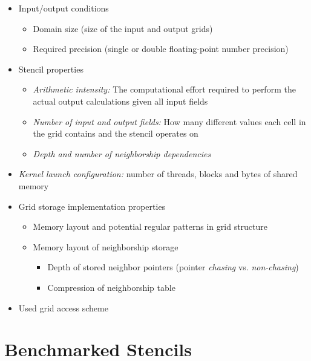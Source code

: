 \begin{itemize}
    \item 
        Input/output conditions 
        \begin{itemize}
            \item Domain size (size of the input and output grids)
            \item Required precision (single or double floating-point number precision)
        \end{itemize}
    \item
        Stencil properties
        \begin{itemize}
            \item \emph{Arithmetic intensity:} The computational effort required to perform the actual output calculations given all input fields
            \item \emph{Number of input and output fields:} How many different values each cell in the grid contains and the stencil operates on
            \item \emph{Depth and number of neighborship dependencies}
        \end{itemize}
    \item
        \emph{Kernel launch configuration:} number of threads, blocks and bytes of shared memory
    \item
        Grid storage implementation properties
        \begin{itemize}
            \item Memory layout and potential regular patterns in grid structure
            \item 
                Memory layout of neighborship storage
                \begin{itemize}
                    \item Depth of stored neighbor pointers (pointer \emph{chasing} vs. \emph{non-chasing})
                    \item Compression of neighborship table
                \end{itemize}
        \end{itemize}
    \item
        Used grid access scheme
\end{itemize}

\section{Benchmarked Stencils}\label{sec:benchmark-setup}

